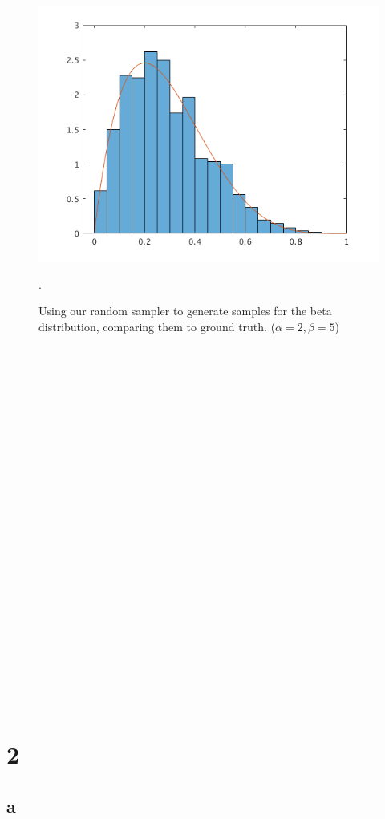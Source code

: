 \documentclass{article}
\begin{document}
\begin{figure}[!ht]
	\centering
	\includegraphics[width=120mm]{q1-beta.png}
	\caption{Using our random sampler to generate samples for the beta 
        distribution, comparing them to ground truth. ($\alpha = 2, \beta = 5$)}.
\end{figure}

~\\
~\\
~\\
~\\
~\\
~\\
~\\
~\\
~\\
~\\
~\\
~\\
~\\
~\\
~\\
~\\
~\\
~\\
~\\
~\\
~\\
~\\
~\\

\section{2}

\subsection{a}
\end{document}
